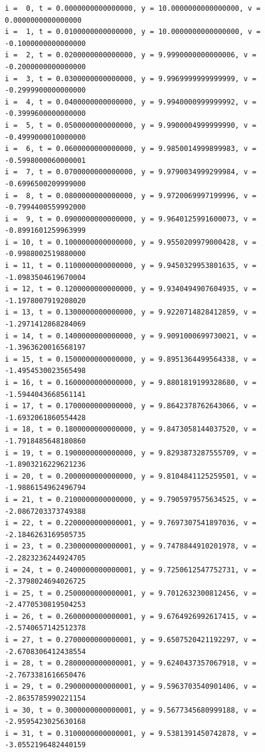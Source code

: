 \documentclass[a4j,titlepage]{jsarticle}
\begin{document}
\begin{lstlisting}[style=text,caption=課題7の実行結果,label=lst:kekka7]
i =  0, t = 0.0000000000000000, y = 10.0000000000000000, v = 0.0000000000000000
i =  1, t = 0.0100000000000000, y = 10.0000000000000000, v = -0.1000000000000000
i =  2, t = 0.0200000000000000, y = 9.9990000000000006, v = -0.2000000000000000
i =  3, t = 0.0300000000000000, y = 9.9969999999999999, v = -0.2999900000000000
i =  4, t = 0.0400000000000000, y = 9.9940000999999992, v = -0.3999600000000000
i =  5, t = 0.0500000000000000, y = 9.9900004999999990, v = -0.4999000010000000
i =  6, t = 0.0600000000000000, y = 9.9850014999899983, v = -0.5998000060000001
i =  7, t = 0.0700000000000000, y = 9.9790034999299984, v = -0.6996500209999000
i =  8, t = 0.0800000000000000, y = 9.9720069997199996, v = -0.7994400559992000
i =  9, t = 0.0900000000000000, y = 9.9640125991600073, v = -0.8991601259963999
i = 10, t = 0.1000000000000000, y = 9.9550209979000428, v = -0.9988002519880000
i = 11, t = 0.1100000000000000, y = 9.9450329953801635, v = -1.0983504619670004
i = 12, t = 0.1200000000000000, y = 9.9340494907604935, v = -1.1978007919208020
i = 13, t = 0.1300000000000000, y = 9.9220714828412859, v = -1.2971412868284069
i = 14, t = 0.1400000000000000, y = 9.9091000699730021, v = -1.3963620016568197
i = 15, t = 0.1500000000000000, y = 9.8951364499564338, v = -1.4954530023565498
i = 16, t = 0.1600000000000000, y = 9.8801819199328680, v = -1.5944043668561141
i = 17, t = 0.1700000000000000, y = 9.8642378762643066, v = -1.6932061860554428
i = 18, t = 0.1800000000000000, y = 9.8473058144037520, v = -1.7918485648180860
i = 19, t = 0.1900000000000000, y = 9.8293873287555709, v = -1.8903216229621236
i = 20, t = 0.2000000000000000, y = 9.8104841125259501, v = -1.9886154962496794
i = 21, t = 0.2100000000000000, y = 9.7905979575634525, v = -2.0867203373749388
i = 22, t = 0.2200000000000001, y = 9.7697307541897036, v = -2.1846263169505735
i = 23, t = 0.2300000000000001, y = 9.7478844910201978, v = -2.2823236244924705
i = 24, t = 0.2400000000000001, y = 9.7250612547752731, v = -2.3798024694026725
i = 25, t = 0.2500000000000001, y = 9.7012632300812456, v = -2.4770530819504253
i = 26, t = 0.2600000000000001, y = 9.6764926992617415, v = -2.5740657142512378
i = 27, t = 0.2700000000000001, y = 9.6507520421192297, v = -2.6708306412438554
i = 28, t = 0.2800000000000001, y = 9.6240437357067918, v = -2.7673381616650476
i = 29, t = 0.2900000000000001, y = 9.5963703540901406, v = -2.8635785990221154
i = 30, t = 0.3000000000000001, y = 9.5677345680999188, v = -2.9595423025630168
i = 31, t = 0.3100000000000001, y = 9.5381391450742878, v = -3.0552196482440159

\end{lstlisting}
\end{document}
